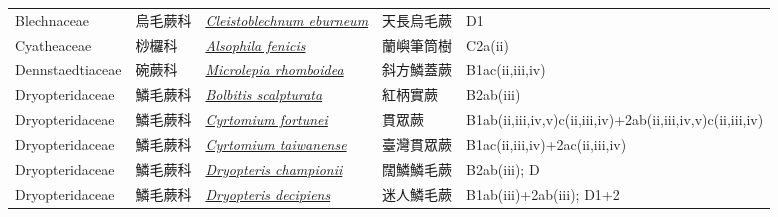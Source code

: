 {\begin{longtable}{L{2.5cm}L{2cm}L{5cm}L{2.5cm}L{3cm}}
    Blechnaceae & 烏毛蕨科 & \href{http://www.theplantlist.org/tpl1.1/search?q=Cleistoblechnum+eburneum}{\textit{Cleistoblechnum eburneum} } & 天長烏毛蕨 & D1    \\
    Cyatheaceae & 桫欏科 & \href{http://www.theplantlist.org/tpl1.1/search?q=Alsophila+fenicis}{\textit{Alsophila fenicis} } & 蘭嶼筆筒樹 & C2a(ii)    \\
    Dennstaedtiaceae & 碗蕨科 & \href{http://www.theplantlist.org/tpl1.1/search?q=Microlepia+rhomboidea}{\textit{Microlepia rhomboidea} } & 斜方鱗蓋蕨 & B1ac(ii,iii,iv)    \\
    Dryopteridaceae & 鱗毛蕨科 & \href{http://www.theplantlist.org/tpl1.1/search?q=Bolbitis+scalpturata}{\textit{Bolbitis scalpturata} } & 紅柄實蕨 & B2ab(iii)    \\
    Dryopteridaceae & 鱗毛蕨科 & \href{http://www.theplantlist.org/tpl1.1/search?q=Cyrtomium+fortunei}{\textit{Cyrtomium fortunei} } & 貫眾蕨 & B1ab(ii,iii,iv,v)c(ii,iii,iv)+2ab(ii,iii,iv,v)c(ii,iii,iv)    \\
    Dryopteridaceae & 鱗毛蕨科 & \href{http://www.theplantlist.org/tpl1.1/search?q=Cyrtomium+taiwanense}{\textit{Cyrtomium taiwanense} } & 臺灣貫眾蕨 & B1ac(ii,iii,iv)+2ac(ii,iii,iv)    \\
    Dryopteridaceae & 鱗毛蕨科 & \href{http://www.theplantlist.org/tpl1.1/search?q=Dryopteris+championii}{\textit{Dryopteris championii} } & 闊鱗鱗毛蕨 & B2ab(iii); D    \\
    Dryopteridaceae & 鱗毛蕨科 & \href{http://www.theplantlist.org/tpl1.1/search?q=Dryopteris+decipiens}{\textit{Dryopteris decipiens} } & 迷人鱗毛蕨 & B1ab(iii)+2ab(iii); D1+2    \\

\end{longtable}}
